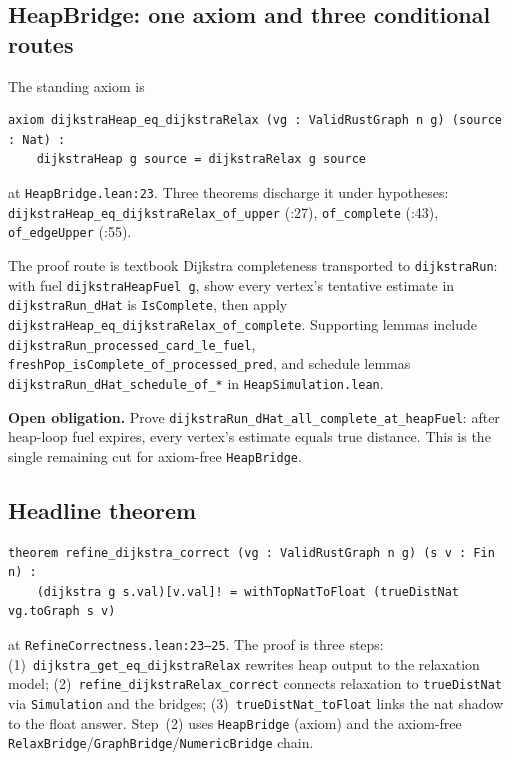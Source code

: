 \documentclass[11pt,a4paper]{article}
\newcommand{\code}[1]{\texttt{#1}}
\theoremstyle{plain}
\theoremstyle{definition}
\begin{document}
\subsection{HeapBridge: one axiom and three conditional routes}\label{sec:refine-heap}

The standing axiom is
\begin{verbatim}
axiom dijkstraHeap_eq_dijkstraRelax (vg : ValidRustGraph n g) (source : Nat) :
    dijkstraHeap g source = dijkstraRelax g source
\end{verbatim}
at \code{HeapBridge.lean:23}. Three theorems discharge it under hypotheses:
\code{dijkstraHeap\_eq\_dijkstraRelax\_of\_upper} (:27),
\code{of\_complete} (:43), \code{of\_edgeUpper} (:55).

The proof route is textbook Dijkstra completeness transported to
\code{dijkstraRun}: with fuel \code{dijkstraHeapFuel g}, show every vertex's
tentative estimate in \code{dijkstraRun\_dHat} is \code{IsComplete}, then apply
\code{dijkstraHeap\_eq\_dijkstraRelax\_of\_complete}.
Supporting lemmas include \code{dijkstraRun\_processed\_card\_le\_fuel},
\code{freshPop\_isComplete\_of\_processed\_pred}, and schedule lemmas
\code{dijkstraRun\_dHat\_schedule\_of\_*} in \code{HeapSimulation.lean}.

\textbf{Open obligation.} Prove
\code{dijkstraRun\_dHat\_all\_complete\_at\_heapFuel}: after heap-loop fuel
expires, every vertex's estimate equals true distance. This is the single
remaining cut for axiom-free \code{HeapBridge}.

\subsection{Headline theorem}\label{sec:refine-headline}

\begin{verbatim}
theorem refine_dijkstra_correct (vg : ValidRustGraph n g) (s v : Fin n) :
    (dijkstra g s.val)[v.val]! = withTopNatToFloat (trueDistNat vg.toGraph s v)
\end{verbatim}
at \code{RefineCorrectness.lean:23--25}. The proof is three steps:
(1)~\code{dijkstra\_get\_eq\_dijkstraRelax} rewrites heap output to the
relaxation model;
(2)~\code{refine\_dijkstraRelax\_correct} connects relaxation to
\code{trueDistNat} via \code{Simulation} and the bridges;
(3)~\code{trueDistNat\_toFloat} links the nat shadow to the float answer.
Step~(2) uses \code{HeapBridge} (axiom) and the axiom-free
\code{RelaxBridge}/\code{GraphBridge}/\code{NumericBridge} chain.
\end{document}
